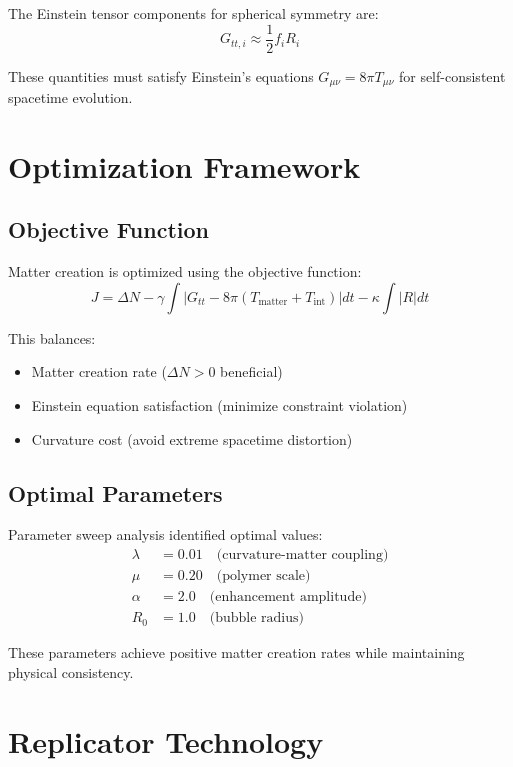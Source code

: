 \documentclass[11pt]{article}
\begin{document}
The Einstein tensor components for spherical symmetry are:
\begin{equation}
G_{tt,i} \approx \frac{1}{2}f_i R_i
\end{equation}

These quantities must satisfy Einstein's equations $G_{\mu\nu} = 8\pi T_{\mu\nu}$ for self-consistent spacetime evolution.

\section{Optimization Framework}

\subsection{Objective Function}

Matter creation is optimized using the objective function:
\begin{equation}
J = \Delta N - \gamma \int |G_{tt} - 8\pi(T_{\text{matter}} + T_{\text{int}})| dt - \kappa \int |R| dt
\end{equation}

This balances:
\begin{itemize}
\item Matter creation rate ($\Delta N > 0$ beneficial)
\item Einstein equation satisfaction (minimize constraint violation)
\item Curvature cost (avoid extreme spacetime distortion)
\end{itemize}

\subsection{Optimal Parameters}

Parameter sweep analysis identified optimal values:
\begin{align}
\lambda &= 0.01 \quad \text{(curvature-matter coupling)} \\
\mu &= 0.20 \quad \text{(polymer scale)} \\
\alpha &= 2.0 \quad \text{(enhancement amplitude)} \\
R_0 &= 1.0 \quad \text{(bubble radius)}
\end{align}

These parameters achieve positive matter creation rates while maintaining physical consistency.

\section{Replicator Technology}
\end{document}

